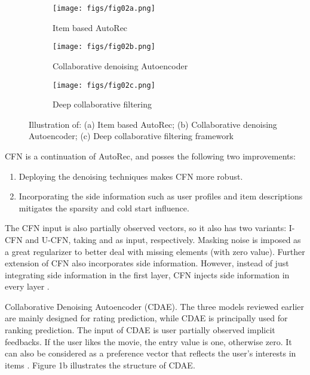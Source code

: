 \documentclass[a4paper,fleqn]{cas-dc}
\begin{document}
\begin{figure}

	\begin{subfigure}{.5\textwidth}
		\centering
		\texttt{[image: figs/fig02a.png]}
		\caption{Item based AutoRec}
		\label{FIG:02:a}
	\end{subfigure}

	\begin{subfigure}{.5\textwidth}
		\centering
		\texttt{[image: figs/fig02b.png]}
		\caption{Collaborative denoising Autoencoder}
		\label{FIG:02:b}
	\end{subfigure}

	\begin{subfigure}{.5\textwidth}
		\centering
		\texttt{[image: figs/fig02c.png]}
		\caption{Deep collaborative filtering}
		\label{FIG:02:c}
	\end{subfigure}

	\caption{Illustration of: (a) Item based AutoRec; (b) Collaborative denoising Autoencoder; (c) Deep collaborative filtering framework \citep{29zhang2019a}}
	\label{FIG:02}
\end{figure}

CFN \citep{30strub2016a, 26strub2015a} is a continuation of AutoRec, and posses the following two improvements:

\begin{enumerate}
	\item Deploying the denoising techniques makes CFN more robust.
	\item Incorporating the side information such as user profiles and item descriptions mitigates the sparsity and cold start influence.
\end{enumerate}

The CFN input is also partially observed vectors, so it also has two variants: I-CFN and U-CFN, taking  and  as input, respectively. Masking noise is imposed as a great regularizer to better deal with missing elements (with zero value). Further extension of CFN also incorporates side information. However, instead of just integrating side information in the first layer, CFN injects side information in every layer \citep{29zhang2019a}.

Collaborative Denoising Autoencoder (CDAE). The three models reviewed earlier are mainly designed for rating prediction, while CDAE \citep{28wu2016a} is principally used for ranking prediction. The input of CDAE is user partially observed implicit feedbacks. If the user likes the movie, the entry value is one, otherwise zero. It can also be considered as a preference vector that reflects the user's interests in items \citep{29zhang2019a}. Figure 1b illustrates the structure of CDAE.
\end{document}
